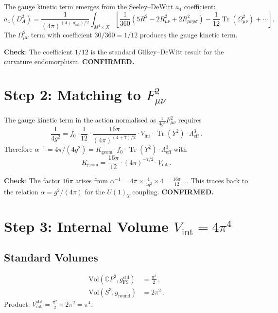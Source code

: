 \documentclass[11pt,a4paper]{article}
\newcommand{\Tr}{\operatorname{Tr}}
\newcommand{\CP}{\mathbb{C}P}
\begin{document}
The gauge kinetic term emerges from the Seeley--DeWitt $a_4$ coefficient:
\begin{equation}
a_4(D_A^2) = \frac{1}{(4\pi)^{(4+d_{\mathrm{int}})/2}}\int_{M^4 \times X}\left[\frac{1}{360}\left(5R^2 - 2R_{\mu\nu}^2 + 2R_{\mu\nu\rho\sigma}^2\right) - \frac{1}{12}\Tr(\Omega_{\mu\nu}^2) + \cdots\right].
\end{equation}
The $\Omega_{\mu\nu}^2$ term with coefficient $30/360 = 1/12$ produces the gauge kinetic term.

\textbf{Check}: The coefficient $1/12$ is the standard Gilkey--DeWitt result for the curvature endomorphism. \textbf{CONFIRMED.}

\section{Step 2: Matching to $F_{\mu\nu}^2$}

The gauge kinetic term in the action normalised as $\frac{1}{4g^2}F_{\mu\nu}^2$ requires
\begin{equation}
\frac{1}{4g^2} = f_0 \cdot \frac{1}{12} \cdot \frac{16\pi}{(4\pi)^{(4+7)/2}} \cdot V_{\mathrm{int}} \cdot \Tr(Y^2) \cdot \Lambda^3_{\mathrm{eff}}\,.
\end{equation}
Therefore $\alpha^{-1} = 4\pi/(4g^2) = K_{\mathrm{geom}} \cdot f_0 \cdot \Tr(Y^2) \cdot \Lambda^3_{\mathrm{eff}}$ with
\begin{equation}
K_{\mathrm{geom}} = \frac{16\pi}{12} \cdot (4\pi)^{-7/2} \cdot V_{\mathrm{int}}\,.
\end{equation}

\textbf{Check}: The factor $16\pi$ arises from $\alpha^{-1} = 4\pi \times \frac{1}{4g^2} \times 4 = \frac{16\pi}{12}\ldots$. This traces back to the relation $\alpha = g^2/(4\pi)$ for the $U(1)_Y$ coupling. \textbf{CONFIRMED.}

\section{Step 3: Internal Volume $V_{\mathrm{int}} = 4\pi^4$}

\subsection{Standard Volumes}
\begin{align}
\mathrm{Vol}(\CP^2, g_{\mathrm{FS}}^{\mathrm{std}}) &= \frac{\pi^2}{2}\,,\\
\mathrm{Vol}(S^3, g_{\mathrm{round}}) &= 2\pi^2\,.
\end{align}
Product: $V_{\mathrm{int}}^{\mathrm{std}} = \frac{\pi^2}{2}\times 2\pi^2 = \pi^4$.
\end{document}
